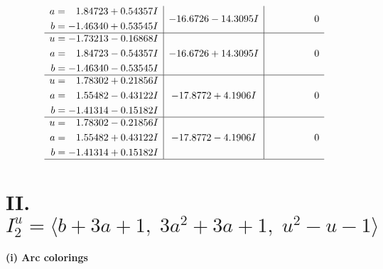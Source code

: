 \documentclass[1p]{elsarticle_modified}
\theoremstyle{definition}
\begin{document}
$$\begin{array}{c|c|c}
\begin{aligned}
a &= \phantom{-}1.84723 + 0.54357 I \\
b &= -1.46340 + 0.53545 I\end{aligned}
 & -16.6726 - 14.3095 I & \phantom{-0.000000 } 0 \\ \hline\begin{aligned}
u &= -1.73213 - 0.16868 I \\
a &= \phantom{-}1.84723 - 0.54357 I \\
b &= -1.46340 - 0.53545 I\end{aligned}
 & -16.6726 + 14.3095 I & \phantom{-0.000000 } 0 \\ \hline\begin{aligned}
u &= \phantom{-}1.78302 + 0.21856 I \\
a &= \phantom{-}1.55482 - 0.43122 I \\
b &= -1.41314 - 0.15182 I\end{aligned}
 & -17.8772 + 4.1906 I & \phantom{-0.000000 } 0 \\ \hline\begin{aligned}
u &= \phantom{-}1.78302 - 0.21856 I \\
a &= \phantom{-}1.55482 + 0.43122 I \\
b &= -1.41314 + 0.15182 I\end{aligned}
 & -17.8772 - 4.1906 I & \phantom{-0.000000 } 0\\
 \hline 
 \end{array}$$\newpage\newpage\renewcommand{\arraystretch}{1}
\centering \section*{II. $I^u_{2}= \langle b+3 a+1,\;3 a^2+3 a+1,\;u^2- u-1 \rangle$}
\flushleft \textbf{(i) Arc colorings}\\
\end{document}
